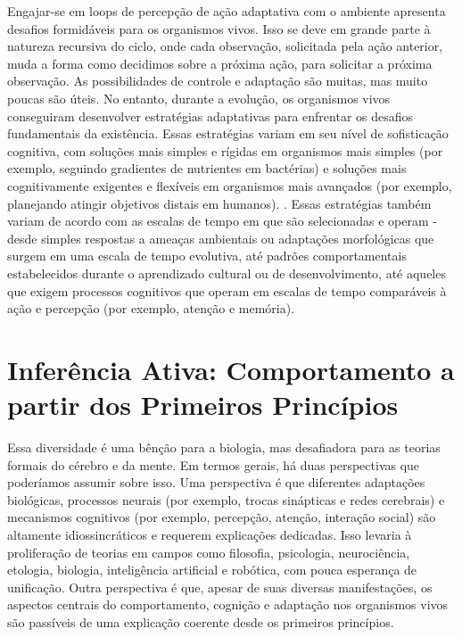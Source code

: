 \documentclass[
  12pt,
]{book}
\begin{document}
Engajar-se em loops de percepção de ação adaptativa com o ambiente apresenta desafios formidáveis \hspace{0pt}\hspace{0pt}para os organismos vivos. Isso se deve em grande parte à natureza recursiva do ciclo, onde cada observação, solicitada pela ação anterior, muda a forma como decidimos sobre a próxima ação, para solicitar a próxima observação. As possibilidades de controle e adaptação são muitas, mas muito poucas são úteis. No entanto, durante a evolução, os organismos vivos conseguiram desenvolver estratégias adaptativas para enfrentar os desafios fundamentais da existência. Essas estratégias variam em seu nível de sofisticação cognitiva, com soluções mais simples e rígidas em organismos mais simples (por exemplo, seguindo gradientes de nutrientes em bactérias) e soluções mais cognitivamente exigentes e flexíveis em organismos mais avançados (por exemplo, planejando atingir objetivos distais em humanos). . Essas estratégias também variam de acordo com as escalas de tempo em que são selecionadas e operam - desde simples respostas a ameaças ambientais ou adaptações morfológicas que surgem em uma escala de tempo evolutiva, até padrões comportamentais estabelecidos durante o aprendizado cultural ou de desenvolvimento, até aqueles que exigem processos cognitivos que operam em escalas de tempo comparáveis à ação e percepção (por exemplo, atenção e memória).

\hypertarget{inferuxeancia-ativa-comportamento-a-partir-dos-primeiros-princuxedpios}{%
\section{Inferência Ativa: Comportamento a partir dos Primeiros Princípios}\label{inferuxeancia-ativa-comportamento-a-partir-dos-primeiros-princuxedpios}}

Essa diversidade é uma bênção para a biologia, mas desafiadora para as teorias formais do cérebro e da mente. Em termos gerais, há duas perspectivas que poderíamos assumir sobre isso. Uma perspectiva é que diferentes adaptações biológicas, processos neurais (por exemplo, trocas sinápticas e redes cerebrais) e mecanismos cognitivos (por exemplo, percepção, atenção, interação social) são altamente idiossincráticos e requerem explicações dedicadas. Isso levaria à proliferação de teorias em campos como filosofia, psicologia, neurociência, etologia, biologia, inteligência artificial e robótica, com pouca esperança de unificação. Outra perspectiva é que, apesar de suas diversas manifestações, os aspectos centrais do comportamento, cognição e adaptação nos organismos vivos são passíveis de uma explicação coerente desde os primeiros princípios.
\end{document}
